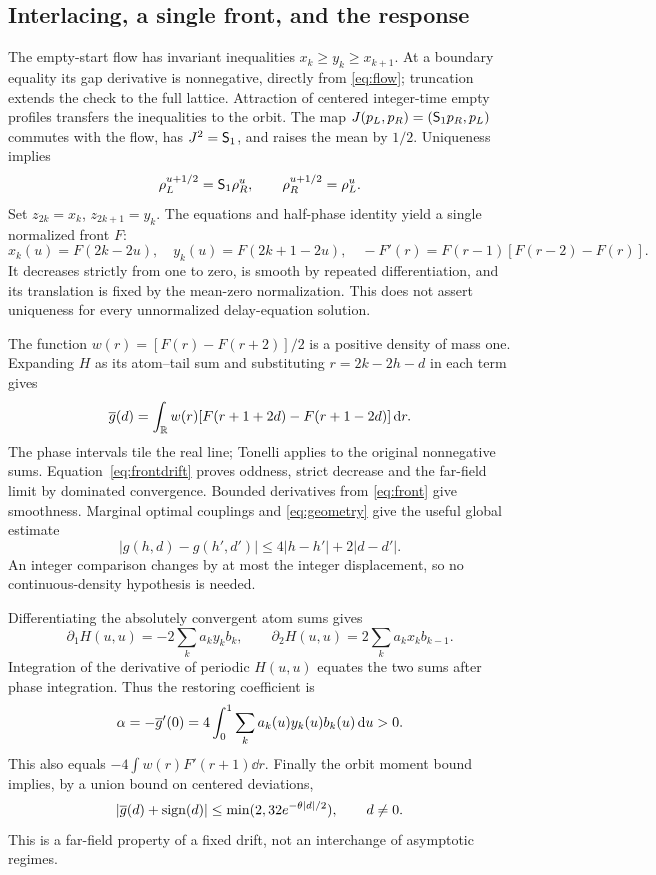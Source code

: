 \subsection{Interlacing, a single front, and the response}
The empty-start flow has invariant inequalities $x_k\ge y_k\ge x_{k+1}$. At a boundary equality its gap derivative is nonnegative, directly from \eqref{eq:flow}; truncation extends the check to the full lattice. Attraction of centered integer-time empty profiles transfers the inequalities to the orbit. The map $J(p_L,p_R)=(\mathsf S_1p_R,p_L)$ commutes with the flow, has $J^2=\mathsf S_1$, and raises the mean by $1/2$. Uniqueness implies
\[
 \rho_L^{u+1/2}=\mathsf S_1\rho_R^u,\qquad
 \rho_R^{u+1/2}=\rho_L^u.
\]
Set $z_{2k}=x_k$, $z_{2k+1}=y_k$. The equations and half-phase identity yield a single normalized front $F$:
\begin{equation}\label{eq:front}
 x_k(u)=F(2k-2u),\quad y_k(u)=F(2k+1-2u),\quad
 -F'(r)=F(r-1)[F(r-2)-F(r)].
\end{equation}
It decreases strictly from one to zero, is smooth by repeated differentiation, and its translation is fixed by the mean-zero normalization. This does not assert uniqueness for every unnormalized delay-equation solution.

The function $w(r)=[F(r)-F(r+2)]/2$ is a positive density of mass one. Expanding $H$ as its atom--tail sum and substituting $r=2k-2h-d$ in each term gives
\begin{equation}\label{eq:frontdrift}
 \overline g(d)=\int_\mathbb R w(r)[F(r+1+2d)-F(r+1-2d)]\,\mathrm d r.
\end{equation}
The phase intervals tile the real line; Tonelli applies to the original nonnegative sums. Equation~\eqref{eq:frontdrift} proves oddness, strict decrease and the far-field limit by dominated convergence. Bounded derivatives from \eqref{eq:front} give smoothness. Marginal optimal couplings and \eqref{eq:geometry} give the useful global estimate
\begin{equation}\label{eq:glip}
 |g(h,d)-g(h',d')|\le4|h-h'|+2|d-d'|.
\end{equation}
An integer comparison changes by at most the integer displacement, so no continuous-density hypothesis is needed.

Differentiating the absolutely convergent atom sums gives
\[
 \partial_1H(u,u)=-2\sum_k a_k y_k b_k,\qquad
 \partial_2H(u,u)=2\sum_k a_k x_k b_{k-1}.
\]
Integration of the derivative of periodic $H(u,u)$ equates the two sums after phase integration. Thus the restoring coefficient is
\begin{equation}\label{eq:alpha}
 \alpha=-\overline g'(0)=4\int_0^1\sum_k a_k(u)y_k(u)b_k(u)\,\mathrm d u>0.
\end{equation}
This also equals $-4\int w(r)F'(r+1)\dd r$. Finally the orbit moment bound implies, by a union bound on centered deviations,
\[
 |\overline g(d)+\operatorname{sign}(d)|\le
 \min(2,32e^{-\theta|d|/2}),\qquad d\ne0.
\]
This is a far-field property of a fixed drift, not an interchange of asymptotic regimes.
